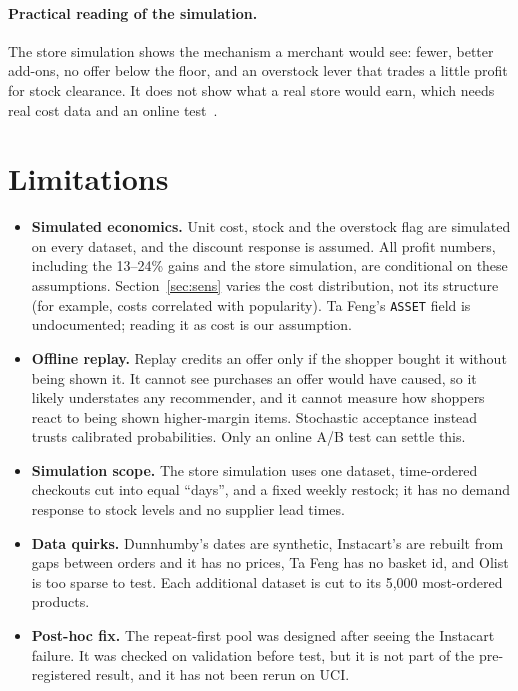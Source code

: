 \documentclass[11pt]{article}
\begin{document}
\paragraph{Practical reading of the simulation.}
The store simulation shows the mechanism a merchant would see: fewer, better add-ons, no offer below the floor, and an overstock lever that trades a little profit for stock clearance.
It does not show what a real store would earn, which needs real cost data and an online test~\citep{kohavi2009controlled}.

\section{Limitations}
\begin{itemize}
\item \textbf{Simulated economics.} Unit cost, stock and the overstock flag are simulated on every dataset, and the discount response is assumed. All profit numbers, including the 13--24\% gains and the store simulation, are conditional on these assumptions. Section~\ref{sec:sens} varies the cost distribution, not its structure (for example, costs correlated with popularity). Ta Feng's \texttt{ASSET} field is undocumented; reading it as cost is our assumption.
\item \textbf{Offline replay.} Replay credits an offer only if the shopper bought it without being shown it. It cannot see purchases an offer would have caused, so it likely understates any recommender, and it cannot measure how shoppers react to being shown higher-margin items. Stochastic acceptance instead trusts calibrated probabilities. Only an online A/B test can settle this.
\item \textbf{Simulation scope.} The store simulation uses one dataset, time-ordered checkouts cut into equal ``days'', and a fixed weekly restock; it has no demand response to stock levels and no supplier lead times.
\item \textbf{Data quirks.} Dunnhumby's dates are synthetic, Instacart's are rebuilt from gaps between orders and it has no prices, Ta Feng has no basket id, and Olist is too sparse to test. Each additional dataset is cut to its 5,000 most-ordered products.
\item \textbf{Post-hoc fix.} The repeat-first pool was designed after seeing the Instacart failure. It was checked on validation before test, but it is not part of the pre-registered result, and it has not been rerun on UCI.

\end{itemize}
\end{document}

